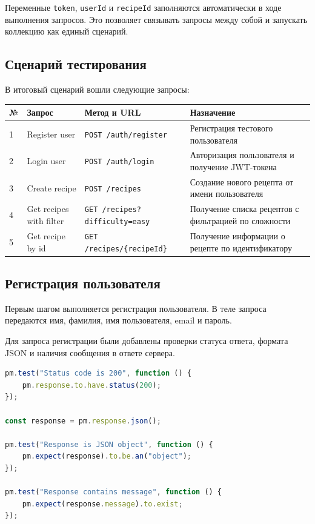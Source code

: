 \documentclass[12pt,a4paper]{article}
\begin{document}
Переменные \texttt{token}, \texttt{userId} и \texttt{recipeId} заполняются автоматически в ходе выполнения запросов. Это позволяет связывать запросы между собой и запускать коллекцию как единый сценарий.

\subsection*{Сценарий тестирования}

В итоговый сценарий вошли следующие запросы:

\begin{longtable}{|p{1cm}|p{4cm}|p{3cm}|p{5cm}|}
\hline
\textbf{№} & \textbf{Запрос} & \textbf{Метод и URL} & \textbf{Назначение} \\
\hline
1 & Register user & \texttt{POST /auth/register} & Регистрация тестового пользователя \\
\hline
2 & Login user & \texttt{POST /auth/login} & Авторизация пользователя и получение JWT-токена \\
\hline
3 & Create recipe & \texttt{POST /recipes} & Создание нового рецепта от имени пользователя \\
\hline
4 & Get recipes with filter & \texttt{GET /recipes?difficulty=easy} & Получение списка рецептов с фильтрацией по сложности \\
\hline
5 & Get recipe by id & \texttt{GET /recipes/\{recipeId\}} & Получение информации о рецепте по идентификатору \\
\hline
\end{longtable}

\subsection*{Регистрация пользователя}

Первым шагом выполняется регистрация пользователя. В теле запроса передаются имя, фамилия, имя пользователя, email и пароль.

Для запроса регистрации были добавлены проверки статуса ответа, формата JSON и наличия сообщения в ответе сервера.

\begin{lstlisting}[language=JavaScript, caption={Пример тестов для запроса регистрации}]
pm.test("Status code is 200", function () {
    pm.response.to.have.status(200);
});

const response = pm.response.json();

pm.test("Response is JSON object", function () {
    pm.expect(response).to.be.an("object");
});

pm.test("Response contains message", function () {
    pm.expect(response.message).to.exist;
});
\end{lstlisting}
\end{document}

